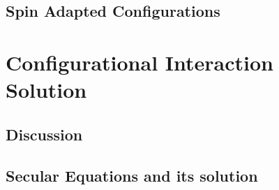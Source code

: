 \documentclass[11pt]{article}   	%
\begin{document}
	
	\subsection{Spin Adapted Configurations}
\section{Configurational Interaction Solution}
	\subsection{Discussion}
	\subsection{Secular Equations and its solution}
\end{document}
